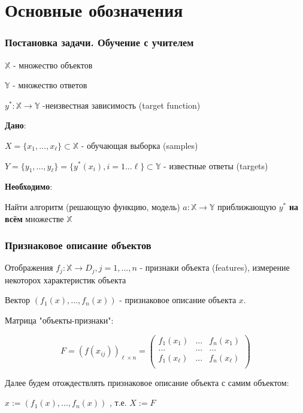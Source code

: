 \documentclass{beamer}
\begin{document}
	
	
	
	\section{Основные обозначения}
	
	
	\begin{frame}
		\frametitle{Постановка задачи. Обучение с учителем}
		
		$\mathbb{X}$ - множество объектов
		
		$\mathbb{Y}$ - множество ответов
		
		$y^{*}: \mathbb{X} \to \mathbb{Y}$ -неизвестная зависимость (target function)
		
		\vspace{15pt}
		
		\textbf{Дано}:
		
		$X = \{x_1, ..., x_\ell\} \subset \mathbb{X}$ - обучающая выборка (samples)
		
		$Y = \{y_1, ..., y_{\ell}\} = \{y^{*}(x_i), i = 1...\ell \} \subset \mathbb{Y}$ - известные ответы (targets)
		
		\vspace{5pt}
		
		\textbf{Необходимо}:
		
		Найти алгоритм (решающую функцию, модель) $a: \mathbb{X} \to \mathbb{Y}$ приближающую $y^{*}$ \textbf{на всём} множестве $\mathbb{X}$		
	\end{frame}


	\begin{frame}
		\frametitle{Признаковое описание объектов}
		
		Отображения $f_j: \mathbb{X} \to D_j, j=1, ..., n$ - признаки объекта (features), измерение некоторох характеристик объекта
		
		
	
		Вектор $(f_1(x), ..., f_n(x))$ - признаковое описание объекта $x$.
		
		\vspace{5pt}
		
		Матрица "объекты-признаки":
		
		 $$
		 F = (f(x_{ij}))_{\ell \times n} = 
		 \begin{pmatrix}
		 	f_{1}(x_1) & ... & f_{n}(x_1) \\
		 	... & ... & ... \\
		 	f_{1}(x_{\ell}) & ... & f_{n}(x_{\ell}) \\		 	
		 \end{pmatrix}
		 $$
		 
		 Далее будем отождествлять признаковое описание объекта с самим объектом:
		 
		 $x := (f_1(x), ..., f_n(x))$
		 , т.е. $X := F$
	\end{frame}
		
\end{document}
